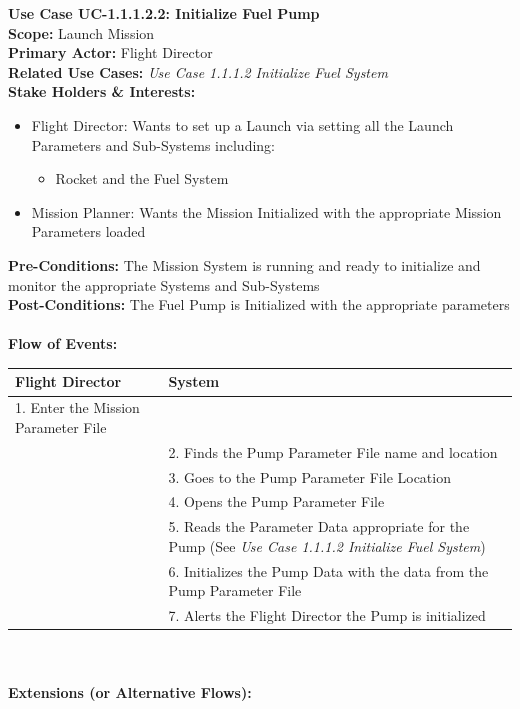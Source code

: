 \documentclass[letterpaper]{article}
\begin{document}
\noindent
\textbf{Use Case UC-1.1.1.2.2:  Initialize Fuel Pump}\\
\textbf{Scope:}  Launch Mission\\
\textbf{Primary Actor:} Flight Director\\
\textbf{Related Use Cases:} 
\textit{Use Case 1.1.1.2 Initialize Fuel System}\\
\textbf{Stake Holders  \& Interests:}
\begin{itemize}
   \item Flight Director:  Wants to set up a Launch via setting all
      the Launch Parameters and Sub-Systems including:
      \begin{itemize}
         \item Rocket and the Fuel System
      \end{itemize}
   \item Mission Planner:  Wants the Mission Initialized with the
      appropriate Mission Parameters loaded
\end{itemize}
\textbf{Pre-Conditions:  }The Mission System is running and ready to
initialize and monitor the appropriate Systems and Sub-Systems\\
\textbf{Post-Conditions:  }The Fuel Pump is Initialized with the
appropriate parameters\\\\
\textbf{Flow of Events:}\\
\begin{tabular}{|p{5.75cm}|p{5.75cm}|}\hline
   \textbf{Flight Director}&\textbf{System}\\\hline
   1.  Enter the Mission Parameter File &\\\hline
   &2.  Finds the Pump Parameter File name and location\\\hline
   &3.  Goes to the Pump Parameter File Location\\\hline
   &4.  Opens the Pump Parameter File\\\hline
   &5.  Reads the Parameter Data appropriate for the Pump (See 
   \textit{Use Case 1.1.1.2 Initialize Fuel System})\\\hline
   &6.  Initializes the Pump Data with the data from the Pump 
   Parameter File\\\hline
   &7.   Alerts the Flight Director the Pump is initialized\\\hline
\end{tabular}\\\\
\textbf{Extensions (or Alternative Flows):}
\end{document}
